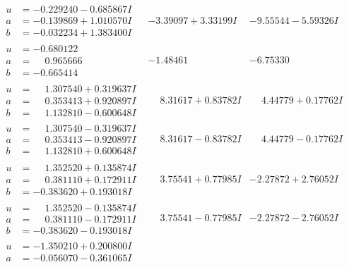 \documentclass[1p]{elsarticle_modified}
\theoremstyle{definition}
\begin{document}
$$\begin{array}{c|c|c}
\begin{aligned}
u &= -0.229240 - 0.685867 I \\
a &= -0.139869 + 1.010570 I \\
b &= -0.032234 + 1.383400 I\end{aligned}
 & -3.39097 + 3.33199 I & -9.55544 - 5.59326 I \\ \hline\begin{aligned}
u &= -0.680122\phantom{ +0.000000I} \\
a &= \phantom{-}0.965666\phantom{ +0.000000I} \\
b &= -0.665414\phantom{ +0.000000I}\end{aligned}
 & -1.48461\phantom{ +0.000000I} & -6.75330\phantom{ +0.000000I} \\ \hline\begin{aligned}
u &= \phantom{-}1.307540 + 0.319637 I \\
a &= \phantom{-}0.353413 + 0.920897 I \\
b &= \phantom{-}1.132810 - 0.600648 I\end{aligned}
 & \phantom{-}8.31617 + 0.83782 I & \phantom{-}4.44779 + 0.17762 I \\ \hline\begin{aligned}
u &= \phantom{-}1.307540 - 0.319637 I \\
a &= \phantom{-}0.353413 - 0.920897 I \\
b &= \phantom{-}1.132810 + 0.600648 I\end{aligned}
 & \phantom{-}8.31617 - 0.83782 I & \phantom{-}4.44779 - 0.17762 I \\ \hline\begin{aligned}
u &= \phantom{-}1.352520 + 0.135874 I \\
a &= \phantom{-}0.381110 + 0.172911 I \\
b &= -0.383620 + 0.193018 I\end{aligned}
 & \phantom{-}3.75541 + 0.77985 I & -2.27872 + 2.76052 I \\ \hline\begin{aligned}
u &= \phantom{-}1.352520 - 0.135874 I \\
a &= \phantom{-}0.381110 - 0.172911 I \\
b &= -0.383620 - 0.193018 I\end{aligned}
 & \phantom{-}3.75541 - 0.77985 I & -2.27872 - 2.76052 I \\ \hline\begin{aligned}
u &= -1.350210 + 0.200800 I \\
a &= -0.056070 - 0.361065 I \\

\end{aligned}
\end{array}$$
\end{document}
